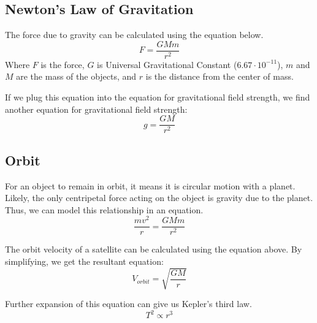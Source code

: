 \documentclass[../notes.tex]{subfiles}
\begin{document}
\subsection{Newton's Law of Gravitation}
The force due to gravity can be calculated using the equation below.
\begin{equation}
	F = \frac{GMm}{r^2}
\end{equation}
Where $F$ is the force, $G$ is Universal Gravitational Constant ($6.67 \cdot 10^{-11}$), $m$ and $M$ are the mass of the objects, and $r$ is the distance from the center of mass.

If we plug this equation into the equation for gravitational field strength, we find another equation for gravitational field strength:
\begin{equation}
	g = \frac{GM}{r^2}
\end{equation}

\subsection{Orbit}
For an object to remain in orbit, it means it is circular motion with a planet.
Likely, the only centripetal force acting on the object is gravity due to the planet.
Thus, we can model this relationship in an equation.
\begin{equation}
	\frac{mv^2}{r} = \frac{GMm}{r^2}
\end{equation}

The orbit velocity of a satellite can be calculated using the equation above.
By simplifying, we get the resultant equation:
\begin{equation}
	V_{orbit} = \sqrt{\frac{GM}{r}}
\end{equation}


Further expansion of this equation can give us Kepler's third law.
\begin{equation}
	T^2 \propto r^3
\end{equation}
\end{document}
